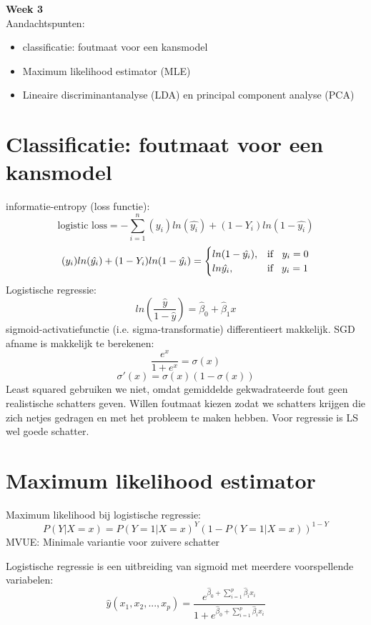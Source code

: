{\large
\textbf{{\LARGE Week 3}}\\
Aandachtspunten:
\begin{itemize}
    \item classificatie: foutmaat voor een kansmodel
    \item Maximum likelihood estimator (MLE)
    \item Lineaire discriminantanalyse (LDA) en principal component analyse (PCA)
\end{itemize}
\section{Classificatie: foutmaat voor een kansmodel}
informatie-entropy (loss functie):
\[\textrm{logistic loss}=-\sum\limits_{i=1}^n(y_i)ln(\hat{y_i})+(1-Y_i)ln(1-\hat{y_i})\]
\[(y_i)ln(\hat{y_i})+(1-Y_i)ln(1-\hat{y_i})=\begin{cases}
    ln(1-\hat{y_i}), & \text{if }\hspace{2mm} y_i=0\\
    ln\hat{y_i}, & \text{if}\hspace{3mm} y_i=1
\end{cases}\]
Logistische regressie:
\[ln(\frac{\hat{y}}{1-\hat{y}})=\hat{\beta}_0+\hat{\beta}_1x\]
sigmoid-activatiefunctie (i.e. sigma-transformatie) differentieert makkelijk. SGD afname is makkelijk te berekenen:
\[\frac{e^x}{1+e^x}=\sigma(x)\]
\[\sigma'(x)=\sigma(x)(1-\sigma(x))\]
Least squared gebruiken we niet, omdat gemiddelde gekwadrateerde fout geen realistische schatters geven. Willen foutmaat kiezen zodat we schatters krijgen die zich netjes gedragen en met het probleem te maken hebben. Voor regressie is LS wel goede schatter.\\


\section{Maximum likelihood estimator}
\noindent Maximum likelihood bij logistische regressie:
\[P(Y|X=x)=P(Y=1|X=x)^Y(1-P(Y=1|X=x))^{1-Y}\]
MVUE: Minimale variantie voor zuivere schatter

\noindent Logistische regressie is een uitbreiding van sigmoid met meerdere voorspellende variabelen:\\
\[\hat{y}(x_1,x_2,...,x_p)=\frac{e^{\hat{\beta}_0+\sum\limits_{i=1}^p\hat{\beta}_ix_i}}{1+e^{\hat{\beta}_0+\sum\limits_{i=1}^p\hat{\beta}_ix_i}}\]

}

